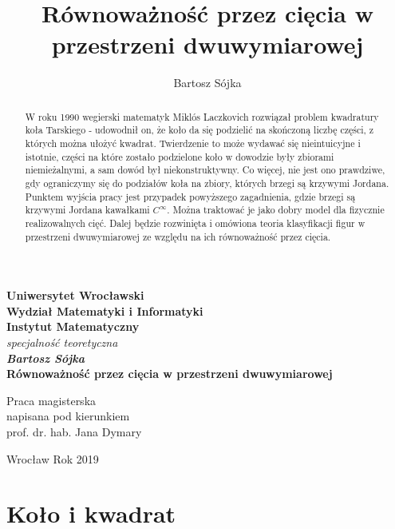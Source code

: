 \documentclass[a4paper, 12pt]{article}
\title{Równoważność przez cięcia w przestrzeni dwuwymiarowej}
\author{Bartosz Sójka}
\begin{document}
\thispagestyle{empty}
\begin{center}
\textbf{\large Uniwersytet Wrocławski\\
Wydział Matematyki i Informatyki\\
Instytut Matematyczny}\\
\textit{\large specjalność teoretyczna}\\
\vspace{4cm}
\textbf{\textit{\large Bartosz Sójka}\\
\vspace{0.5cm}
{\Large Równoważność przez cięcia w przestrzeni dwuwymiarowej}}\\
\end{center}
\vspace{3cm}
{\large \hspace*{6.5cm}Praca magisterska\\
\hspace*{6.5cm}napisana pod kierunkiem\\
\hspace*{6.5cm}prof. dr. hab. Jana Dymary }\\
\vfill
\begin{center}
{\large Wrocław Rok 2019}\\
\end{center}
\newpage
\null
\thispagestyle{empty}
\newpage
\tableofcontents

\begin{abstract}
    W roku 1990 wegierski matematyk Miklós Laczkovich rozwiązał problem kwadratury koła Tarskiego - udowodnił
     on, że koło da się podzielić na skończoną liczbę części, z których można ułożyć kwadrat. Twierdzenie
     to może wydawać się nieintuicyjne i istotnie, części na które zostało podzielone koło w dowodzie były
     zbiorami niemieżalnymi, a sam dowód był niekonstruktywny. Co więcej, nie jest ono prawdziwe, gdy
     ograniczymy się do podziałów koła na zbiory, których brzegi są krzywymi Jordana. Punktem wyjścia
     pracy jest przypadek powyższego zagadnienia, gdzie brzegi są krzywymi Jordana kawałkami $C^\infty$.
     Można traktować je jako dobry model dla fizycznie realizowalnych cięć. Dalej będzie rozwinięta i
     omówiona teoria klasyfikacji figur w przestrzeni dwuwymiarowej ze względu na ich równoważność przez
     cięcia.
 \end{abstract}

 \section{Koło i kwadrat}
\end{document}
